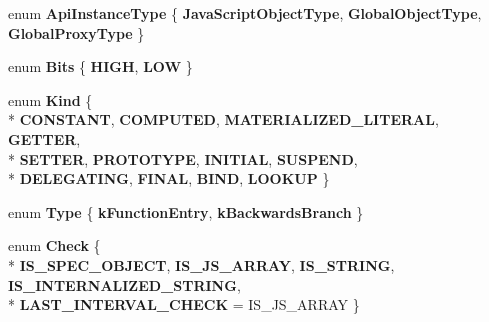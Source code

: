 \begin{DoxyCompactItemize}
\item 
\hypertarget{classv8_1_1internal_1_1_v8___f_i_n_a_l_ac1d2d46cd00314199f2c12ed951029a8}{}enum {\bfseries Api\+Instance\+Type} \{ {\bfseries Java\+Script\+Object\+Type}, 
{\bfseries Global\+Object\+Type}, 
{\bfseries Global\+Proxy\+Type}
 \}\label{classv8_1_1internal_1_1_v8___f_i_n_a_l_ac1d2d46cd00314199f2c12ed951029a8}

\item 
\hypertarget{classv8_1_1internal_1_1_v8___f_i_n_a_l_ade5a3072e6057aae007e4e193c24ad08}{}enum {\bfseries Bits} \{ {\bfseries H\+I\+G\+H}, 
{\bfseries L\+O\+W}
 \}\label{classv8_1_1internal_1_1_v8___f_i_n_a_l_ade5a3072e6057aae007e4e193c24ad08}

\item 
\hypertarget{classv8_1_1internal_1_1_v8___f_i_n_a_l_ab798cb8a78cc1c893470afbceaf1e960}{}enum {\bfseries Kind} \{ \\*
{\bfseries C\+O\+N\+S\+T\+A\+N\+T}, 
{\bfseries C\+O\+M\+P\+U\+T\+E\+D}, 
{\bfseries M\+A\+T\+E\+R\+I\+A\+L\+I\+Z\+E\+D\+\_\+\+L\+I\+T\+E\+R\+A\+L}, 
{\bfseries G\+E\+T\+T\+E\+R}, 
\\*
{\bfseries S\+E\+T\+T\+E\+R}, 
{\bfseries P\+R\+O\+T\+O\+T\+Y\+P\+E}, 
{\bfseries I\+N\+I\+T\+I\+A\+L}, 
{\bfseries S\+U\+S\+P\+E\+N\+D}, 
\\*
{\bfseries D\+E\+L\+E\+G\+A\+T\+I\+N\+G}, 
{\bfseries F\+I\+N\+A\+L}, 
{\bfseries B\+I\+N\+D}, 
{\bfseries L\+O\+O\+K\+U\+P}
 \}\label{classv8_1_1internal_1_1_v8___f_i_n_a_l_ab798cb8a78cc1c893470afbceaf1e960}

\item 
\hypertarget{classv8_1_1internal_1_1_v8___f_i_n_a_l_ae362fdaae39329892b0cd44e65d81cf2}{}enum {\bfseries Type} \{ {\bfseries k\+Function\+Entry}, 
{\bfseries k\+Backwards\+Branch}
 \}\label{classv8_1_1internal_1_1_v8___f_i_n_a_l_ae362fdaae39329892b0cd44e65d81cf2}

\item 
\hypertarget{classv8_1_1internal_1_1_v8___f_i_n_a_l_adfc7070a4194d3b73f2198945331c15b}{}enum {\bfseries Check} \{ \\*
{\bfseries I\+S\+\_\+\+S\+P\+E\+C\+\_\+\+O\+B\+J\+E\+C\+T}, 
{\bfseries I\+S\+\_\+\+J\+S\+\_\+\+A\+R\+R\+A\+Y}, 
{\bfseries I\+S\+\_\+\+S\+T\+R\+I\+N\+G}, 
{\bfseries I\+S\+\_\+\+I\+N\+T\+E\+R\+N\+A\+L\+I\+Z\+E\+D\+\_\+\+S\+T\+R\+I\+N\+G}, 
\\*
{\bfseries L\+A\+S\+T\+\_\+\+I\+N\+T\+E\+R\+V\+A\+L\+\_\+\+C\+H\+E\+C\+K} = I\+S\+\_\+\+J\+S\+\_\+\+A\+R\+R\+A\+Y
 \}\label{classv8_1_1internal_1_1_v8___f_i_n_a_l_adfc7070a4194d3b73f2198945331c15b}


\end{DoxyCompactItemize}
